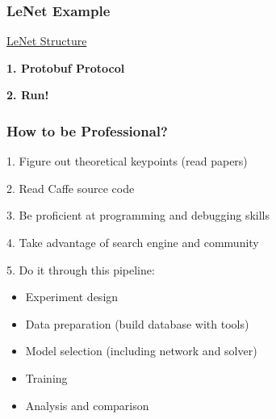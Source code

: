 \documentclass{beamer}
\begin{document}
\begin{frame}
\frametitle{LeNet Example}
\hyperlink{review}{LeNet Structure}\par
\vspace{10pt}
\textbf{1. Protobuf Protocol}\par
\vspace{10pt}
\textbf{2. Run!}
\end{frame}

\begin{frame}
\frametitle{How to be Professional?}
1. Figure out theoretical keypoints (read papers)\par
2. Read Caffe source code\par
3. Be proficient at programming and debugging skills\par
4. Take advantage of search engine and community\par
5. Do it through this pipeline:
\begin{itemize}
\item Experiment design
\item Data preparation (build database with tools)
\item Model selection (including network and solver)
\item Training
\item Analysis and comparison
\end{itemize}
\end{frame}
\end{document}
